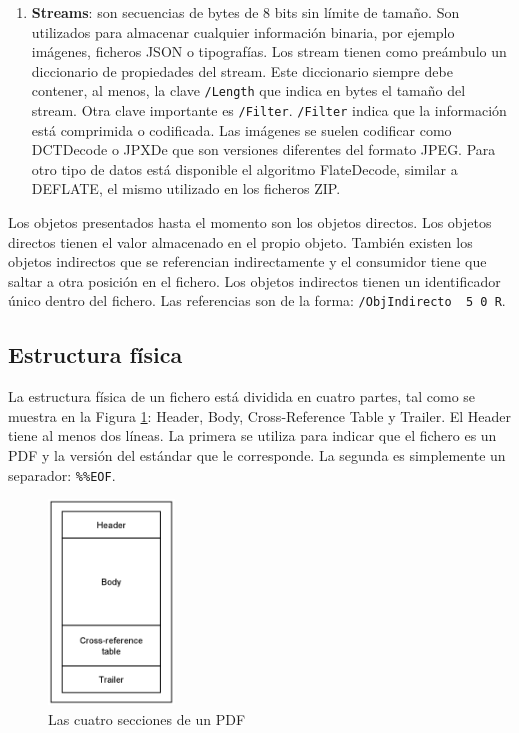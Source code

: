 \begin{enumerate}
    \item \textbf{Streams}: son secuencias de bytes de 8 bits sin límite de tamaño. Son utilizados para almacenar cualquier información binaria, por ejemplo imágenes, ficheros JSON o tipografías. Los stream tienen como preámbulo un diccionario de propiedades del stream. Este diccionario siempre debe contener, al menos, la clave \verb|/Length| que indica en bytes el tamaño del stream. Otra clave importante es \verb|/Filter|. \verb|/Filter| indica que la información está comprimida o codificada. Las imágenes se suelen codificar como DCTDecode o JPXDe que son versiones diferentes del formato JPEG. Para otro tipo de datos está disponible el algoritmo FlateDecode, similar a  DEFLATE, el mismo utilizado en los ficheros ZIP.
\end{enumerate}

Los objetos presentados hasta el momento son los objetos directos. Los objetos directos tienen el valor almacenado en el propio objeto. También existen los objetos indirectos que se referencian indirectamente y el consumidor tiene que saltar a otra posición en el fichero. Los objetos indirectos tienen un identificador único dentro del fichero. Las referencias son de la forma: \verb|/ObjIndirecto  5 0 R|.

\subsection{Estructura física}

La estructura física de un fichero está dividida en cuatro partes, tal como se muestra en la Figura \ref{fig:secciones-pdf}: Header, Body, Cross-Reference Table y Trailer. El Header tiene al menos dos líneas. La primera se utiliza para indicar que el fichero es un PDF y la versión del estándar que le corresponde. La segunda es simplemente un separador: \verb|%%EOF|. 

\begin{figure}[hp!]
    \centering
    \includegraphics[width=0.3\textwidth]{imaxes/c-bases-teoricas/secciones-de-un-pdf.png}
    \caption{Las cuatro secciones de un PDF}
    \label{fig:secciones-pdf}
\end{figure}

